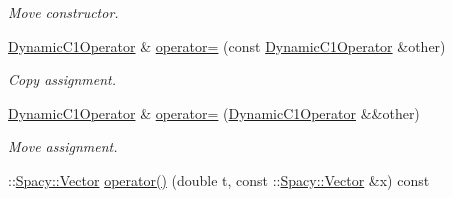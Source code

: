 \begin{DoxyCompactItemize}
\begin{DoxyCompactList}\small\item\em Move constructor. \end{DoxyCompactList}\item 
\hyperlink{classSpacy_1_1FEniCS_1_1DynamicC1Operator}{Dynamic\+C1\+Operator} \& \hyperlink{classSpacy_1_1FEniCS_1_1DynamicC1Operator_ae6ae04ff3d672f9189546739fdbb3761_ae6ae04ff3d672f9189546739fdbb3761}{operator=} (const \hyperlink{classSpacy_1_1FEniCS_1_1DynamicC1Operator}{Dynamic\+C1\+Operator} \&other)
\begin{DoxyCompactList}\small\item\em Copy assignment. \end{DoxyCompactList}\item 
\hyperlink{classSpacy_1_1FEniCS_1_1DynamicC1Operator}{Dynamic\+C1\+Operator} \& \hyperlink{classSpacy_1_1FEniCS_1_1DynamicC1Operator_a68b3d95830250fe78f25122504e1a5b3_a68b3d95830250fe78f25122504e1a5b3}{operator=} (\hyperlink{classSpacy_1_1FEniCS_1_1DynamicC1Operator}{Dynamic\+C1\+Operator} \&\&other)
\begin{DoxyCompactList}\small\item\em Move assignment. \end{DoxyCompactList}\item 
\hypertarget{classSpacy_1_1FEniCS_1_1DynamicC1Operator_ab84fc5febd8f2fc8b3acbd74548c8c39}{}\+::\hyperlink{classSpacy_1_1Vector}{Spacy\+::\+Vector} \hyperlink{classSpacy_1_1FEniCS_1_1DynamicC1Operator_ab84fc5febd8f2fc8b3acbd74548c8c39}{operator()} (double t, const \+::\hyperlink{classSpacy_1_1Vector}{Spacy\+::\+Vector} \&x) const \label{classSpacy_1_1FEniCS_1_1DynamicC1Operator_ab84fc5febd8f2fc8b3acbd74548c8c39}


\end{DoxyCompactItemize}
